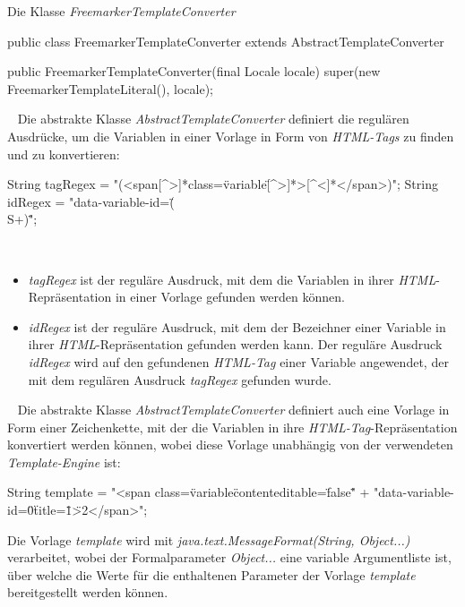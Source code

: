 \begin{program}
\caption{Die Klasse \emph{FreemarkerTemplateConverter}}
\label{prog:freemarkerTemplateConverter}
\begin{JavaCode}
public class FreemarkerTemplateConverter 
                          extends AbstractTemplateConverter {

    public FreemarkerTemplateConverter(final Locale locale) {
        super(new FreemarkerTemplateLiteral(), locale);
    }
    
}
\end{JavaCode}
\end{program}
\ \newline
Die abstrakte Klasse \emph{AbstractTemplateConverter} definiert die regulären Ausdrücke, um die Variablen in einer Vorlage in Form von \emph{HTML-Tags} zu finden und zu konvertieren:
\begin{JavaCode}[numbers=none]
String tagRegex = "(<span[^>]*class=\"variable\"[^>]*>[^<]*</span>)";
String idRegex  = "data-variable-id=\"(\\S+)\"";
\end{JavaCode}
\ \begin{itemize}
	\item\emph{tagRegex} ist der reguläre Ausdruck, mit dem die Variablen in ihrer \emph{HTML}-Repräsentation in einer Vorlage gefunden werden können.
	\item\emph{idRegex} ist der reguläre Ausdruck, mit dem der Bezeichner einer Variable in ihrer \emph{HTML}-Repräsentation gefunden werden kann. Der reguläre Ausdruck \emph{idRegex} wird auf den gefundenen \emph{HTML-Tag} einer Variable angewendet, der mit dem regulären Ausdruck \emph{tagRegex} gefunden wurde.
\end{itemize}
\ \newline
Die abstrakte Klasse \emph{AbstractTemplateConverter} definiert auch eine Vorlage in Form einer Zeichenkette, mit der die Variablen in ihre \emph{HTML-Tag}-Repräsentation konvertiert werden können, wobei diese Vorlage unabhängig von der verwendeten \emph{Template-Engine} ist:
\begin{JavaCode}
String template = "<span class=\"variable\" contenteditable=\"false\" "
                + "data-variable-id=\"{0}\" title=\"{1}\">{2}</span>";
\end{JavaCode}
Die Vorlage \emph{template} wird mit \emph{java.text.MessageFormat(String, Object...)} verarbeitet, wobei der Formalparameter \emph{Object...} eine variable Argumentliste ist, über welche die Werte für die enthaltenen Parameter der Vorlage \emph{template} bereitgestellt werden können. 
\newpage

